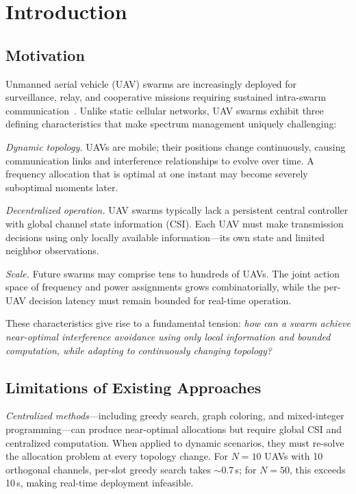 \documentclass[journal]{IEEEtran}
\begin{document}
\section{Introduction}
\label{sec:intro}

\subsection{Motivation}
Unmanned aerial vehicle (UAV) swarms are increasingly deployed for surveillance, relay, and cooperative missions requiring sustained intra-swarm communication~\cite{ref_uav_swarm}. Unlike static cellular networks, UAV swarms exhibit three defining characteristics that make spectrum management uniquely challenging:

\textit{Dynamic topology.} UAVs are mobile; their positions change continuously, causing communication links and interference relationships to evolve over time. A frequency allocation that is optimal at one instant may become severely suboptimal moments later.

\textit{Decentralized operation.} UAV swarms typically lack a persistent central controller with global channel state information (CSI). Each UAV must make transmission decisions using only locally available information---its own state and limited neighbor observations.

\textit{Scale.} Future swarms may comprise tens to hundreds of UAVs. The joint action space of frequency and power assignments grows combinatorially, while the per-UAV decision latency must remain bounded for real-time operation.

These characteristics give rise to a fundamental tension: \emph{how can a swarm achieve near-optimal interference avoidance using only local information and bounded computation, while adapting to continuously changing topology?}

\subsection{Limitations of Existing Approaches}

\textit{Centralized methods}---including greedy search, graph coloring, and mixed-integer programming---can produce near-optimal allocations but require global CSI and centralized computation. When applied to dynamic scenarios, they must re-solve the allocation problem at every topology change. For $N=10$ UAVs with 10 orthogonal channels, per-slot greedy search takes $\sim$0.7\,s; for $N=50$, this exceeds 10\,s, making real-time deployment infeasible.
\end{document}
